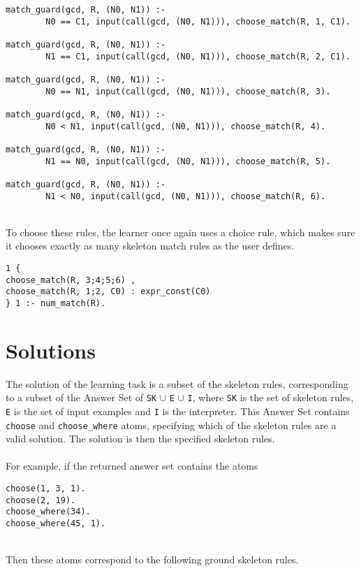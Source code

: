 \begin{lstlisting}
match_guard(gcd, R, (N0, N1)) :- 
		N0 == C1, input(call(gcd, (N0, N1))), choose_match(R, 1, C1).
		
match_guard(gcd, R, (N0, N1)) :- 
		N1 == C1, input(call(gcd, (N0, N1))), choose_match(R, 2, C1).
		
match_guard(gcd, R, (N0, N1)) :- 
		N0 == N1, input(call(gcd, (N0, N1))), choose_match(R, 3).
		
match_guard(gcd, R, (N0, N1)) :- 
		N0 < N1, input(call(gcd, (N0, N1))), choose_match(R, 4).
		
match_guard(gcd, R, (N0, N1)) :- 
		N1 == N0, input(call(gcd, (N0, N1))), choose_match(R, 5).
		
match_guard(gcd, R, (N0, N1)) :- 
		N1 < N0, input(call(gcd, (N0, N1))), choose_match(R, 6).
\end{lstlisting}
\mbox{}\\
To choose these rules, the learner once again uses a choice rule, which makes sure it chooses exactly as many skeleton match rules as the user defines. \\

\begin{lstlisting}
1 {
choose_match(R, 3;4;5;6) ,
choose_match(R, 1;2, C0) : expr_const(C0)
} 1 :- num_match(R).
\end{lstlisting}

\section{Solutions}
The solution of the learning task is a subset of the skeleton rules, corresponding to a subset of the Answer Set of \lstinline!SK! $\cup$ \lstinline!E! $\cup$ \lstinline!I!, where \lstinline!SK! is the set of skeleton rules, \lstinline!E! is the set of input examples and \lstinline!I! is the interpreter. This Answer Set contains \lstinline!choose! and \lstinline!choose_where! atoms, specifying which of the skeleton rules are a valid solution. The solution is then the specified skeleton rules. \\ \\
For example, if the returned answer set contains the atoms \\

\begin{lstlisting}
choose(1, 3, 1).
choose(2, 19).
choose_where(34).
choose_where(45, 1).
\end{lstlisting}
\mbox{}\\
Then these atoms correspond to the following ground skeleton rules.\\

